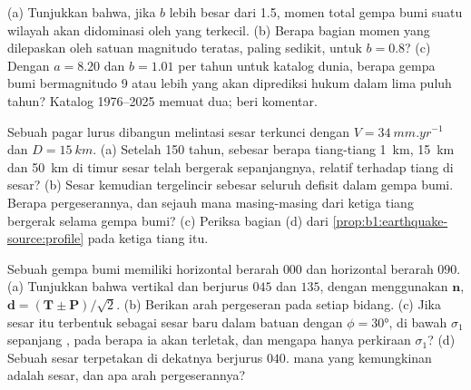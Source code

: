 \begin{exercise}[$\star\star\star$]\label{exo:b1:earthquake-source:10}
(a) Tunjukkan bahwa, jika $b$ lebih besar dari 1.5, momen total gempa bumi suatu wilayah akan didominasi oleh yang terkecil. (b) Berapa bagian momen yang dilepaskan oleh satuan magnitudo teratas, paling sedikit, untuk $b = 0.8$? (c) Dengan $a = 8.20$ dan $b = 1.01$ per tahun untuk katalog dunia, berapa gempa bumi bermagnitudo 9 atau lebih yang akan diprediksi hukum dalam lima puluh tahun? Katalog 1976--2025 memuat dua; beri komentar.
\end{exercise}

\begin{exercise}[$\star\star\star$]\label{exo:b1:earthquake-source:11}
Sebuah pagar lurus dibangun melintasi sesar  terkunci dengan $V =
\qty{34}{mm.yr^{-1}}$ dan $D = \qty{15}{km}$. (a) Setelah 150 tahun, sebesar berapa tiang-tiang \qty{1}{km}, \qty{15}{km} dan \qty{50}{km} di timur sesar telah bergerak sepanjangnya, relatif terhadap tiang di sesar? (b) Sesar kemudian tergelincir sebesar seluruh defisit dalam gempa bumi. Berapa pergeserannya, dan sejauh mana masing-masing dari ketiga tiang bergerak selama gempa bumi? (c) Periksa bagian (d) dari \cref{prop:b1:earthquake-source:profile} pada ketiga tiang itu.
\end{exercise}

\begin{exercise}[$\star\star\star$]\label{exo:b1:earthquake-source:12}
Sebuah gempa bumi memiliki  horizontal berarah $000$ dan  horizontal berarah $090$. (a) Tunjukkan bahwa  vertikal dan berjurus $045$ dan $135$, dengan menggunakan $\mathbf n$, $\mathbf d = (\mathbf T \pm \mathbf P)/\sqrt2$. (b) Berikan arah pergeseran pada setiap bidang. (c) Jika sesar itu terbentuk sebagai sesar baru dalam batuan dengan $\phi = \ang{30}$, di bawah $\sigma_1$ sepanjang , pada  berapa ia akan terletak, dan mengapa  hanya perkiraan $\sigma_1$? (d) Sebuah sesar terpetakan di dekatnya berjurus $040$.  mana yang kemungkinan adalah sesar, dan apa arah pergeserannya?
\end{exercise}

